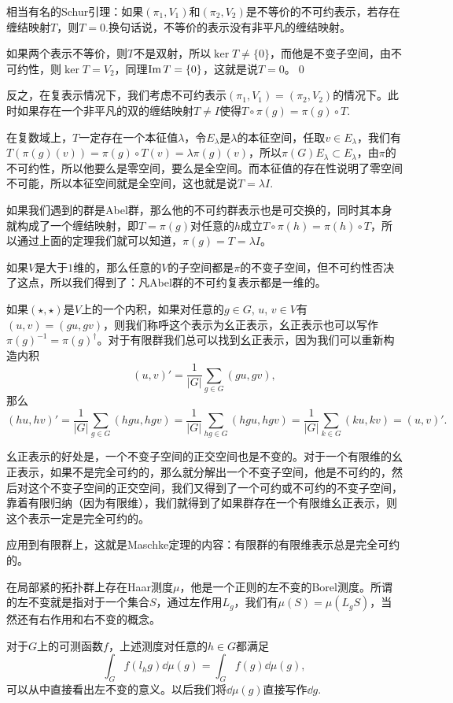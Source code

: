\documentclass[9pt]{extarticle}
\begin{document}
\lem 相当有名的Schur引理：如果$(\pi_1,V_1)$和$(\pi_2,V_2)$是不等价的不可约表示，若存在缠结映射$T$，则$T=0$.换句话说，不等价的表示没有非平凡的缠结映射。

\proof 如果两个表示不等价，则$T$不是双射，所以$\ker T\neq \{0\}$，而他是不变子空间，由不可约性，则$\ker T= V_2$，同理$\operatorname{Im}  T= \{0\}$，这就是说$T=0$。\qed

\para 反之，在复表示情况下，我们考虑不可约表示$(\pi_1,V_1)=(\pi_2,V_2)$的情况下。此时如果存在一个非平凡的双的缠结映射$T\neq I$使得$T\circ \pi(g)=\pi(g)\circ T$.

在复数域上，$T$一定存在一个本征值$\lambda$，令$E_\lambda$是$\lambda$的本征空间，任取$v\in E_\lambda$，我们有$T(\pi(g)(v))=\pi(g)\circ T(v)=\lambda\pi(g)(v)$，所以$\pi(G)E_\lambda\subset E_\lambda$，由$\pi$的不可约性，所以他要么是零空间，要么是全空间。而本征值的存在性说明了零空间不可能，所以本征空间就是全空间，这也就是说$T=\lambda I$.

\para 如果我们遇到的群是Abel群，那么他的不可约群表示也是可交换的，同时其本身就构成了一个缠结映射，即$T=\pi(g)$对任意的$h$成立$T\circ \pi(h)=\pi(h)\circ T$，所以通过上面的定理我们就可以知道，$\pi(g)=T=\lambda I$。

如果$V$是大于$1$维的，那么任意的$V$的子空间都是$\pi$的不变子空间，但不可约性否决了这点，所以我们得到了：凡Abel群的不可约复表示都是一维的。

\para 如果$(\star,\star)$是$V$上的一个内积，如果对任意的$g\in G$, $u$, $v\in V$有$(u,v)=(gu,gv)$，则我们称呼这个表示为幺正表示，幺正表示也可以写作$\pi(g)^{-1}=\pi(g)^\dag$。对于有限群我们总可以找到幺正表示，因为我们可以重新构造内积
\[
	(u,v)'=\frac{1}{|G|}\sum_{g\in G}(gu,gv),
\]
那么
\[
	(hu,hv)'=\frac{1}{|G|}\sum_{g\in G}(hgu,hgv)=\frac{1}{|G|}\sum_{hg\in G}(hgu,hgv)=\frac{1}{|G|}\sum_{k\in G}(ku,kv)=(u,v)'.
\]

幺正表示的好处是，一个不变子空间的正交空间也是不变的。对于一个有限维的幺正表示，如果不是完全可约的，那么就分解出一个不变子空间，他是不可约的，然后对这个不变子空间的正交空间，我们又得到了一个可约或不可约的不变子空间，靠着有限归纳（因为有限维），我们就得到了如果群存在一个有限维幺正表示，则这个表示一定是完全可约的。

应用到有限群上，这就是Maschke定理的内容：有限群的有限维表示总是完全可约的。 

\theo 在局部紧的拓扑群上存在Haar测度$\mu$，他是一个正则的左不变的Borel测度。所谓的左不变就是指对于一个集合$S$，通过左作用$L_g$，我们有$\mu(S)=\mu(L_gS)$，当然还有右作用和右不变的概念。

对于$G$上的可测函数$f$，上述测度对任意的$h\in G$都满足
\[
	\int_G f(l_h g)\dd \mu(g)=\int_G f(g)\dd \mu(g),
\]
可以从中直接看出左不变的意义。以后我们将$\dd \mu(g)$直接写作$\dd g$.
\end{document}
